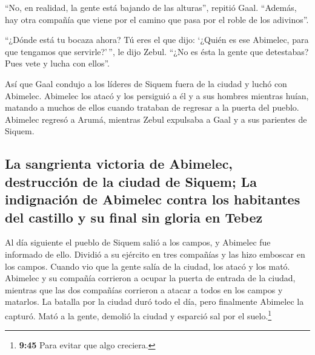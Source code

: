  ``No, en realidad, la gente está bajando de las
alturas'', repitió Gaal. ``Además, hay otra compañía que viene por el
camino que pasa por el roble de los adivinos''.

 ``¿Dónde está tu bocaza ahora? Tú eres el que dijo:
`¿Quién es ese Abimelec, para que tengamos que servirle?'\,'', le dijo
Zebul. ``¿No es ésta la gente que detestabas? Pues vete y lucha con
ellos''.

 Así que Gaal condujo a los líderes de Siquem fuera de la
ciudad y luchó con Abimelec.  Abimelec los atacó y los
persiguió a él y a sus hombres mientras huían, matando a muchos de ellos
cuando trataban de regresar a la puerta del pueblo. 
Abimelec regresó a Arumá, mientras Zebul expulsaba a Gaal y a sus
parientes de Siquem.

\hypertarget{la-sangrienta-victoria-de-abimelec-destrucciuxf3n-de-la-ciudad-de-siquem-la-indignaciuxf3n-de-abimelec-contra-los-habitantes-del-castillo-y-su-final-sin-gloria-en-tebez}{%
\subsection{La sangrienta victoria de Abimelec, destrucción de la ciudad
de Siquem; La indignación de Abimelec contra los habitantes del castillo
y su final sin gloria en
Tebez}\label{la-sangrienta-victoria-de-abimelec-destrucciuxf3n-de-la-ciudad-de-siquem-la-indignaciuxf3n-de-abimelec-contra-los-habitantes-del-castillo-y-su-final-sin-gloria-en-tebez}}

 Al día siguiente el pueblo de Siquem salió a los campos,
y Abimelec fue informado de ello.  Dividió a su ejército
en tres compañías y las hizo emboscar en los campos. Cuando vio que la
gente salía de la ciudad, los atacó y los mató.  Abimelec
y su compañía corrieron a ocupar la puerta de entrada de la ciudad,
mientras que las dos compañías corrieron a atacar a todos en los campos
y matarlos.  La batalla por la ciudad duró todo el día,
pero finalmente Abimelec la capturó. Mató a la gente, demolió la ciudad
y esparció sal por el suelo.\footnote{\textbf{9:45} Para evitar que algo
  creciera.}

